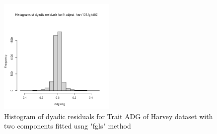 %

\begin{figure}[ht]
  \centering
  \includegraphics[width=0.5\textwidth]{harv101fig1.png}
  \caption{Histogram of dyadic residuals for Trait  ADG of Harvey dataset
           with two components fitted usng "fgls" method}
  \label{fig:1}
\end{figure}

%

